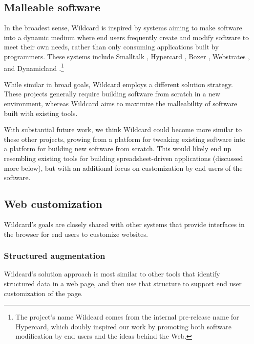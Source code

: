 \documentclass[english,submission]{programming}
\begin{document}
\hypertarget{malleable-software}{%
\subsection{Malleable software}\label{malleable-software}}

In the broadest sense, Wildcard is inspired by systems aiming to make
software into a dynamic medium where end users frequently create and
modify software to meet their own needs, rather than only consuming
applications built by programmers. These systems include Smalltalk
\autocite{kay1977}, Hypercard \autocite{hypercard2019} , Boxer
\autocite{disessa1986}, Webstrates \autocite{klokmose2015}, and
Dynamicland \autocite{victor}.\footnote{The project's name Wildcard
  comes from the internal pre-release name for Hypercard, which doubly
  inspired our work by promoting both software modification by end users
  and the ideas behind the Web.}

While similar in broad goals, Wildcard employs a different solution
strategy. These projects generally require building software from
scratch in a new environment, whereas Wildcard aims to maximize the
malleability of software built with existing tools.

With substantial future work, we think Wildcard could become more
similar to these other projects, growing from a platform for tweaking
existing software into a platform for building new software from
scratch. This would likely end up resembling existing tools for building
spreadsheet-driven applications (discussed more below), but with an
additional focus on customization by end users of the software.

\hypertarget{web-customization}{%
\subsection{Web customization}\label{web-customization}}

Wildcard's goals are closely shared with other systems that provide
interfaces in the browser for end users to customize websites.

\hypertarget{structured-augmentation}{%
\subsubsection{Structured augmentation}\label{structured-augmentation}}

Wildcard's solution approach is most similar to other tools that
identify structured data in a web page, and then use that structure to
support end user customization of the page.
\end{document}
